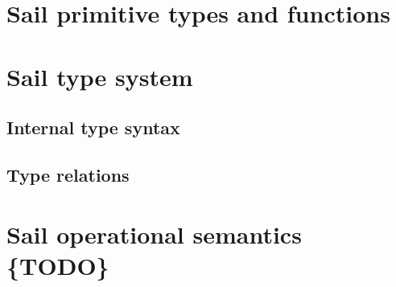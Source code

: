 \documentclass[11pt]{article}
\begin{document}
\newpage
\section{Sail primitive types and functions}

\ottgrammartabular{
\ottbuiltXXinXXtypes\ottinterrule}

\ottgrammartabular{
\ottbuiltXXinXXtypeXXabbreviations\ottinterrule
\ottfunctions\ottinterrule
\ottfunctionsXXwithXXcoercions\ottinterrule}
\newpage

\section{Sail type system}

\subsection{Internal type syntax}

\ottgrammartabular{
\ottk\ottinterrule
\ottt\ottinterrule
\ottoptx\ottinterrule
\otttag\ottinterrule
\ottne\ottinterrule
\otttXXarg\ottinterrule
\otttXXargs\ottinterrule
\ottnec\ottinterrule
\ottSXXN\ottinterrule
\ottEXXd\ottinterrule
\ottkinf\ottinterrule
\otttid\ottinterrule
\ottEXXk\ottinterrule
\otttinf\ottinterrule
\ottEXXa\ottinterrule
\ottfieldXXtyps\ottinterrule
\ottEXXr\ottinterrule
\ottenumerateXXmap\ottinterrule
\ottEXXe\ottinterrule
\ottEXXt\ottinterrule
\ottts\ottinterrule
\ottE\ottinterrule
\ottI\ottinterrule
\ottformula\ottinterrule}


\subsection{ Type relations }
\ottdefnss

\section{Sail operational semantics \{TODO\}}
\end{document}
